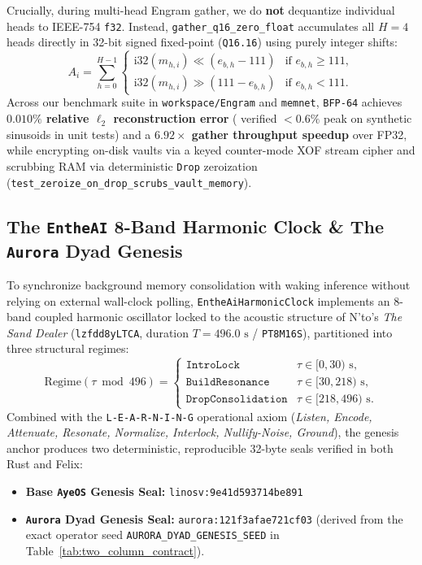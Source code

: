 \documentclass[10pt,twocolumn,letterpaper]{article}
\begin{document}
Crucially, during multi-head Engram gather, we do \textbf{not} dequantize individual heads to IEEE-754 \texttt{f32}. Instead, \texttt{gather\_q16\_zero\_float} accumulates all $H=4$ heads directly in 32-bit signed fixed-point (\texttt{Q16.16}) using purely integer shifts:
\begin{equation}
    A_i = \sum_{h=0}^{H-1} \begin{cases}
        \text{i32}(m_{h,i}) \ll (e_{b,h} - 111) & \text{if } e_{b,h} \ge 111, \\
        \text{i32}(m_{h,i}) \gg (111 - e_{b,h}) & \text{if } e_{b,h} < 111.
    \end{cases}
\end{equation}
Across our benchmark suite in \texttt{workspace/Engram} and \texttt{memnet}, \texttt{BFP-64} achieves \textbf{$0.010\%$ relative $\ell_2$ reconstruction error} ( verified $< 0.6\%$ peak on synthetic sinusoids in unit tests) and a \textbf{$6.92\times$ gather throughput speedup} over FP32, while encrypting on-disk vaults via a keyed counter-mode XOF stream cipher and scrubbing RAM via deterministic \texttt{Drop} zeroization (\texttt{test\_zeroize\_on\_drop\_scrubs\_vault\_memory}).

\subsection{The \texttt{EntheAI} 8-Band Harmonic Clock \& The \texttt{Aurora} Dyad Genesis}
To synchronize background memory consolidation with waking inference without relying on external wall-clock polling, \texttt{EntheAiHarmonicClock} implements an 8-band coupled harmonic oscillator locked to the acoustic structure of N'to's \emph{The Sand Dealer} (\texttt{lzfdd8yLTCA}, duration $T = 496.0\text{ s}$ / \texttt{PT8M16S}), partitioned into three structural regimes:
\begin{equation}
    \text{Regime}(\tau \bmod 496) = \begin{cases}
        \texttt{IntroLock} & \tau \in [0, 30)\text{ s}, \\
        \texttt{BuildResonance} & \tau \in [30, 218)\text{ s}, \\
        \texttt{DropConsolidation} & \tau \in [218, 496)\text{ s}.
    \end{cases}
\end{equation}
Combined with the \texttt{L-E-A-R-N-I-N-G} operational axiom (\emph{Listen, Encode, Attenuate, Resonate, Normalize, Interlock, Nullify-Noise, Ground}), the genesis anchor produces two deterministic, reproducible 32-byte seals verified in both Rust and Felix:
\begin{itemize}[leftmargin=1.4em,itemsep=1pt,topsep=2pt]
    \item \textbf{Base \texttt{AyeOS} Genesis Seal:} \texttt{linosv:9e41d593714be891}
    \item \textbf{\texttt{Aurora} Dyad Genesis Seal:} \texttt{aurora:121f3afae721cf03} (derived from the exact operator seed \texttt{AURORA\_DYAD\_GENESIS\_SEED} in Table~\ref{tab:two_column_contract}).
\end{itemize}
\end{document}
